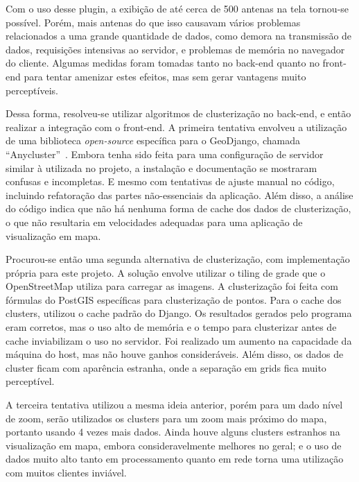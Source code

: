 \documentclass[]{politex}
\begin{document}
Com o uso desse plugin, a exibição de até cerca de 500 antenas na tela tornou-se
possível. Porém, mais antenas do que isso causavam vários problemas relacionados
a uma grande quantidade de dados, como demora na transmissão de dados,
requisições intensivas ao servidor, e problemas de memória no navegador do
cliente. Algumas medidas foram tomadas tanto no back-end quanto no front-end
para tentar amenizar estes efeitos, mas sem gerar vantagens muito perceptíveis.

Dessa forma, resolveu-se utilizar algoritmos de clusterização no back-end, e
então realizar a integração com o front-end. A primeira tentativa envolveu a
utilização de uma biblioteca \textit{open-source} específica para o GeoDjango,
chamada ``Anycluster''~\cite{anycluster}. Embora tenha sido feita para uma
configuração de servidor similar à utilizada no projeto, a instalação e
documentação se mostraram confusas e incompletas. E mesmo com tentativas de
ajuste manual no código, incluindo refatoração das partes não-essenciais da
aplicação. Além disso, a análise do código indica que não há nenhuma forma de
cache dos dados de clusterização, o que não resultaria em velocidades adequadas
para uma aplicação de visualização em mapa.

Procurou-se então uma segunda alternativa de clusterização, com implementação
própria para este projeto. A solução envolve utilizar o tiling de grade que o
OpenStreetMap utiliza para carregar as imagens. A clusterização foi feita com
fórmulas do PostGIS específicas para clusterização de pontos. Para o cache dos
clusters, utilizou o cache padrão do Django. Os resultados gerados pelo programa
eram corretos, mas o uso alto de memória e o tempo para clusterizar antes de
cache inviabilizam o uso no servidor. Foi realizado um aumento na capacidade
da máquina do host, mas não houve ganhos consideráveis. Além disso, os dados
de cluster ficam com aparência estranha, onde a separação em grids fica muito
perceptível.

A terceira tentativa utilizou a mesma ideia anterior, porém para um dado nível
de zoom, serão utilizados os clusters para um zoom mais próximo do mapa,
portanto usando 4 vezes mais dados. Ainda houve alguns clusters estranhos na
visualização em mapa, embora consideravelmente melhores no geral; e o uso de
dados muito alto tanto em processamento quanto em rede torna uma utilização com
muitos clientes inviável.
\end{document}

